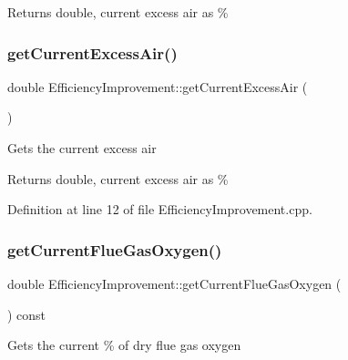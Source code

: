 \begin{DoxyReturn}{Returns}
double, current excess air as \% 
\end{DoxyReturn}
\mbox{\label{class_efficiency_improvement_a42cd83e1c57f065077e31f21b3552a76}} 
\subsubsection{\texorpdfstring{get\+Current\+Excess\+Air()}{getCurrentExcessAir()}\hspace{0.1cm}{\footnotesize\ttfamily [3/3]}}
{\footnotesize\ttfamily double Efficiency\+Improvement\+::get\+Current\+Excess\+Air (\begin{DoxyParamCaption}{ }\end{DoxyParamCaption})}

Gets the current excess air

\begin{DoxyReturn}{Returns}
double, current excess air as \% 
\end{DoxyReturn}


Definition at line 12 of file Efficiency\+Improvement.\+cpp.

\mbox{\label{class_efficiency_improvement_a8b66a676d696f7a9fcc8fa987371d80b}} 
\subsubsection{\texorpdfstring{get\+Current\+Flue\+Gas\+Oxygen()}{getCurrentFlueGasOxygen()}\hspace{0.1cm}{\footnotesize\ttfamily [1/3]}}
{\footnotesize\ttfamily double Efficiency\+Improvement\+::get\+Current\+Flue\+Gas\+Oxygen (\begin{DoxyParamCaption}{ }\end{DoxyParamCaption}) const\hspace{0.3cm}{\ttfamily [inline]}}

Gets the current \% of dry flue gas oxygen

